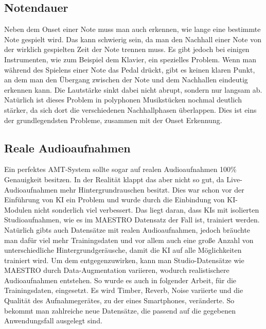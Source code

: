 \subsection{Notendauer}
Neben dem Onset einer Note muss man auch erkennen, wie lange eine bestimmte Note gespielt wird.
Das kann schwierig sein, da man den Nachhall einer Note von der wirklich gespielten Zeit der Note trennen muss.
Es gibt jedoch bei einigen Instrumenten, wie zum Beispiel dem Klavier, ein spezielles Problem.
Wenn man während des Spielens einer Note das Pedal drückt, gibt es keinen klaren Punkt,
an dem man den Übergang zwischen der Note und dem Nachhallen eindeutig erkennen kann.
Die Lautstärke sinkt dabei nicht abrupt, sondern nur langsam ab.
Natürlich ist dieses Problem in polyphonen Musikstücken nochmal deutlich stärker,
da sich dort die verschiedenen Nachhallphasen überlappen.
Dies ist eins der grundlegendsten Probleme, zusammen mit der Onset Erkennung.
\cite{jamshidi2024machine}

\subsection{Reale Audioaufnahmen}
Ein perfektes AMT-System sollte sogar auf realen Audioaufnahmen 100\% Genauigkeit besitzen.
In der Realität klappt das aber nicht so gut, da Live-Audioaufnahmen mehr Hintergrundrauschen besitzt.
Dies war schon vor der Einführung von KI ein Problem und wurde durch die Einbindung
von KI-Modulen nicht sonderlich viel verbessert.
Das liegt daran, dass KIs mit isolierten Studioaufnahmen, wie es im MAESTRO Datensatz der Fall ist, trainiert werden.
Natürlich gibts auch Datensätze mit realen Audioaufnahmen, jedoch bräuchte man dafür viel mehr Trainingsdaten und
vor allem auch eine große Anzahl von unterschiedliche Hintergrundgeräusche,
damit die KI auf alle Möglichkeiten trainiert wird.
Um dem entgegenzuwirken, kann man Studio-Datensätze wie MAESTRO durch Data-Augmentation variieren,
wodurch realistischere Audioaufnahmen entstehen.
So wurde es auch in folgender Arbeit, für die Trainingsdaten, eingesetzt.
\cite{kusaka2024mobile}
Es wird Timber, Reverb, Noise variierte und die Qualität des Aufnahmegerätes, zu der eines Smartphones, veränderte.
So bekommt man zahlreiche neue Datensätze, die passend auf die gegebenen Anwendungsfall ausgelegt sind.


